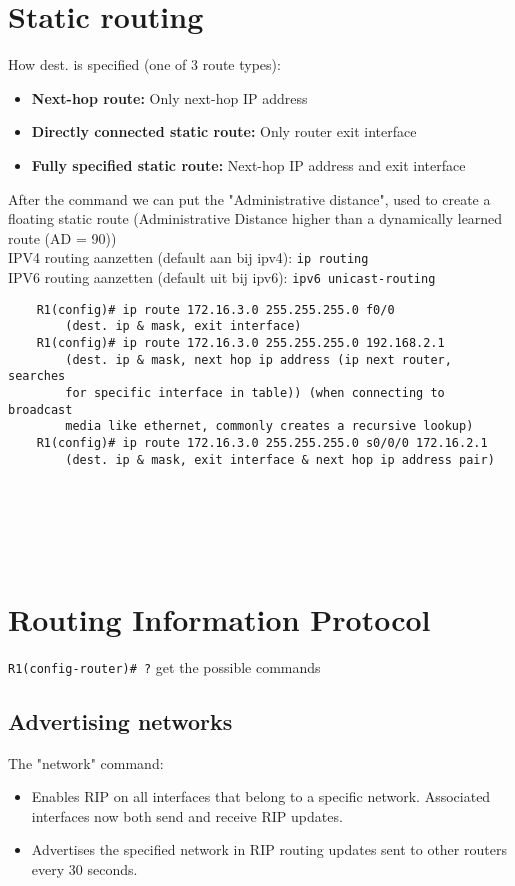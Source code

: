 \documentclass[10pt, a4paper]{article}
\begin{document}
	\section{Static routing}
	How dest. is specified (one of 3 route types):	
	\begin{itemize}[noitemsep,nolistsep]
		\item \textbf{Next-hop route:} Only next-hop IP address
		\item \textbf{Directly connected static route:} Only router exit interface
		\item \textbf{Fully specified static route:} Next-hop IP address and exit interface\\
	\end{itemize}
	After the command we can put the "Administrative distance", used to create a floating static route (Administrative Distance higher than a dynamically learned route (AD = 90))\\
	IPV4 routing aanzetten (default aan bij ipv4): \texttt{ip routing}\\
	IPV6 routing aanzetten (default uit bij ipv6): \texttt{ipv6 unicast-routing}\\
	\begin{lstlisting}
	R1(config)# ip route 172.16.3.0 255.255.255.0 f0/0
		(dest. ip & mask, exit interface)
	R1(config)# ip route 172.16.3.0 255.255.255.0 192.168.2.1
		(dest. ip & mask, next hop ip address (ip next router, searches 
		for specific interface in table)) (when connecting to broadcast
		media like ethernet, commonly creates a recursive lookup)
	R1(config)# ip route 172.16.3.0 255.255.255.0 s0/0/0 172.16.2.1
		(dest. ip & mask, exit interface & next hop ip address pair)
	\end{lstlisting}
	\ \\ \\ \\ \\
	
	\section{Routing Information Protocol}
	\texttt{R1(config-router)\# ?} get the possible commands
	\subsection{Advertising networks}
	The "network" command:
	\begin{itemize}[noitemsep,nolistsep]
		\item Enables RIP on all interfaces that belong to a specific network. Associated interfaces now both send and receive RIP updates.
		\item Advertises the specified network in RIP routing updates sent to other routers every 30 seconds.\\
	\end{itemize}
	
\end{document}

